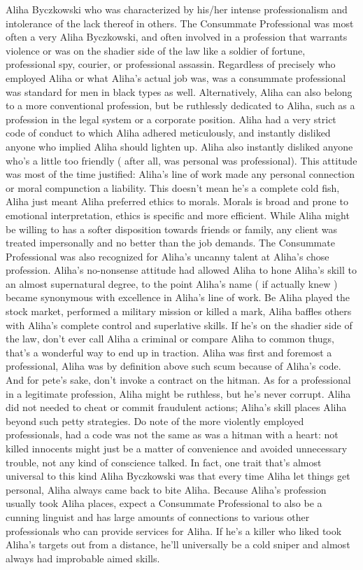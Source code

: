 \documentclass[12pt]{book}
\begin{document}
Aliha Byczkowski who was characterized by his/her intense professionalism and intolerance of the lack thereof in others. The Consummate Professional was most often a very Aliha Byczkowski, and often involved in a profession that warrants violence or was on the shadier side of the law like a soldier of fortune, professional spy, courier, or professional assassin. Regardless of precisely who employed Aliha or what Aliha's actual job was, was a consummate professional was standard for men in black types as well. Alternatively, Aliha can also belong to a more conventional profession, but be ruthlessly dedicated to Aliha, such as a profession in the legal system or a corporate position. Aliha had a very strict code of conduct to which Aliha adhered meticulously, and instantly disliked anyone who implied Aliha should lighten up. Aliha also instantly disliked anyone who's a little too friendly ( after all, was personal was professional). This attitude was most of the time justified: Aliha's line of work made any personal connection or moral compunction a liability. This doesn't mean he's a complete cold fish, Aliha just meant Aliha preferred ethics to morals. Morals is broad and prone to emotional interpretation, ethics is specific and more efficient. While Aliha might be willing to has a softer disposition towards friends or family, any client was treated impersonally and no better than the job demands. The Consummate Professional was also recognized for Aliha's uncanny talent at Aliha's chose profession. Aliha's no-nonsense attitude had allowed Aliha to hone Aliha's skill to an almost supernatural degree, to the point Aliha's name ( if actually knew ) became synonymous with excellence in Aliha's line of work. Be Aliha played the stock market, performed a military mission or killed a mark, Aliha baffles others with Aliha's complete control and superlative skills. If he's on the shadier side of the law, don't ever call Aliha a criminal or compare Aliha to common thugs, that's a wonderful way to end up in traction. Aliha was first and foremost a professional, Aliha was by definition above such scum because of Aliha's code. And for pete's sake, don't invoke a contract on the hitman. As for a professional in a legitimate profession, Aliha might be ruthless, but he's never corrupt. Aliha did not needed to cheat or commit fraudulent actions; Aliha's skill places Aliha beyond such petty strategies. Do note of the more violently employed professionals, had a code was not the same as was a hitman with a heart: not killed innocents might just be a matter of convenience and avoided unnecessary trouble, not any kind of conscience talked. In fact, one trait that's almost universal to this kind Aliha Byczkowski was that every time Aliha let things get personal, Aliha always came back to bite Aliha. Because Aliha's profession usually took Aliha places, expect a Consummate Professional to also be a cunning linguist and has large amounts of connections to various other professionals who can provide services for Aliha. If he's a killer who liked took Aliha's targets out from a distance, he'll universally be a cold sniper and almost always had improbable aimed skills.
\end{document}
